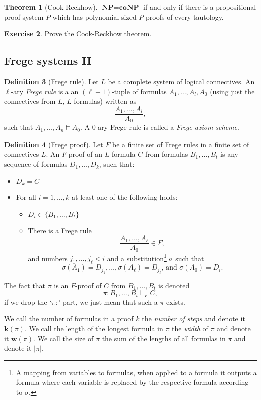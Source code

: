 \documentclass{article}
\theoremstyle{definition}
\newtheorem{thrm}{Theorem}
\newtheorem{excs}[thrm]{Exercise}
\newtheorem{defi}[thrm]{Definition}
\newcommand{\abs}[1]{\lvert #1 \rvert}
\newcommand{\NP}{\textbf{NP}}
\newcommand{\coNP}{\textbf{coNP}}
\newcommand{\w}{\textbf{w}}
\renewcommand{\k}{\textbf{k}}
\begin{document}
\begin{thrm}[Cook-Reckhow]
    $\NP=\coNP$ if and only if there is a propositional proof system $P$ which has polynomial sized $P$-proofs of every tautology.
\end{thrm}

\begin{excs}
    Prove the Cook-Reckhow theorem.
\end{excs}

\subsection*{Frege systems II}


\begin{defi}[Frege rule]
    Let $L$ be a complete system of logical connectives. An $\ell$-ary \emph{Frege rule} is a an $(\ell+1)$-tuple of formulas $A_1,\dots, A_l, A_0$ (using just the connectives from $L$, $L$-formulas) written as \[\frac{A_1,\dots,A_l}{A_0},\]
    such that $A_1,\dots, A_n \models A_0$. A $0$-ary Frege rule is called a \emph{Frege axiom scheme}.
\end{defi}

\begin{defi}[Frege proof]
   Let $F$ be a finite set of Frege rules in a finite set of connectives $L$. An $F$-proof of an $L$-formula $C$ from formulas $B_1,\dots,B_t$ is any sequence of formulas $D_1,\dots,D_k$, such that:
   \begin{itemize}
        \item $D_k = C$
        \item For all $i=1,\dots,k$ at least one of the following holds:
        \begin{itemize}
            \item $D_i\in\{B_1,\dots,B_t\}$
            \item There is a Frege rule \[\frac{A_1,\dots,A_\ell}{A_0}\in F, \] and numbers $j_1,\dots,j_\ell < i$ and a substitution\footnote{A mapping from variables to formulas, when applied to a formula it outputs a formula where each variable is replaced by the respective formula according to $\sigma$.} $\sigma$ such that \[\sigma(A_1)=D_{j_1},\dots,\sigma(A_\ell)=D_{j_\ell}\text{, and } \sigma(A_0)=D_i.\] 
        \end{itemize}
   \end{itemize}
   The fact that $\pi$ is an $F$-proof of $C$ from $B_1,\dots,B_t$ is denoted
   \[\pi: B_1,\dots,B_t \vdash_F C, \]
   if we drop the `$\pi:$' part, we just mean that such a $\pi$ exists. 

   We call the number of formulas in a proof $k$ the \emph{number of steps} and denote it $\k(\pi)$. We call the length of the longest formula in $\pi$ the \emph{width} of $\pi$ and denote it $\w(\pi)$. We call the size of $\pi$ the sum of the lengths of all formulas in $\pi$ and denote it $\abs{\pi}$.
\end{defi}
\end{document}
